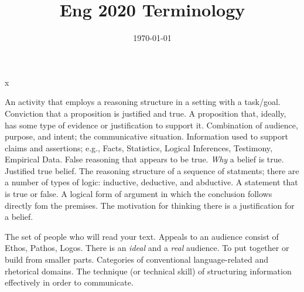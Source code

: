 x\documentclass{article}
\begin{document}
\title{Eng 2020 Terminology}
\date{\today}
\maketitle

 An activity that employs a reasoning structure in a setting with a task/goal. 
 Conviction that a proposition is justified and true.
 A proposition that, ideally, has some type of evidence or
justification to support it.
 Combination of audience, purpose, and intent; the communicative situation.
 Information used to support claims and assertions; e.g., {\sc Facts, Statistics, Logical Inferences, Testimony, Empirical Data}. 
 False reasoning that appears to be true.
 \textsl{Why} a belief is true.
 Justified true belief.
 The reasoning structure of a sequence of statments; there are a number of types of logic: inductive, deductive, and abductive.
 A statement that is true or false.
 A logical form of argument in which the conclusion follows directly fom the premises.
 The motivation for thinking there is a justification for a
belief.
\xe

 The set of people who will read your text. Appeals to an audience consist of {\sc Ethos, Pathos, Logos}. There is an {\sl ideal} and a {\sl real} audience.
 To put together or build from smaller parts.
 Categories of conventional language-related and rhetorical domains. 
 The technique (or technical skill) of structuring information effectively in order to communicate.
\xe


\end{document}
